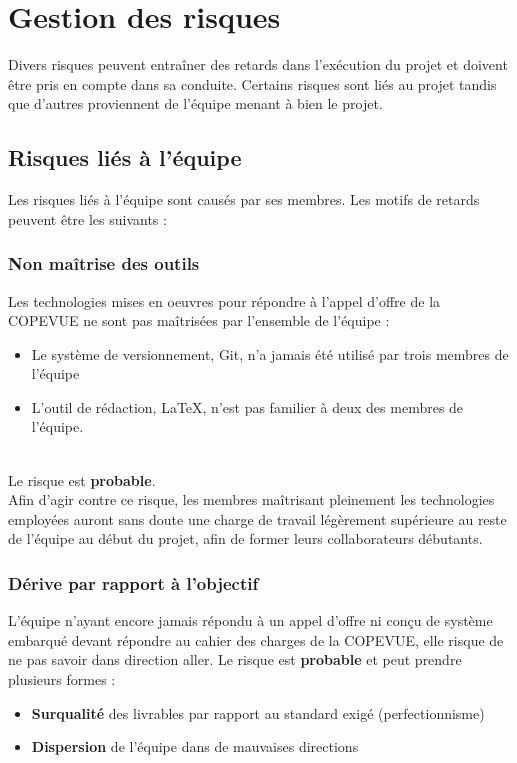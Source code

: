 \section{Gestion des risques}

Divers risques peuvent entraîner des retards dans l'exécution du projet et
doivent être pris en compte dans sa conduite. Certains risques sont liés au
projet tandis que d'autres proviennent de l'équipe menant à bien le projet.

\subsection{Risques liés à l'équipe}

Les risques liés à l'équipe sont causés par ses membres. Les motifs de
retards peuvent être les suivants :

\subsubsection{Non maîtrise des outils}

Les technologies mises en oeuvres pour répondre à l'appel d'offre de la
COPEVUE ne sont pas maîtrisées par l'ensemble de l'équipe :
\begin{itemize}
\item Le système de versionnement, Git, n'a jamais été utilisé par trois
membres de l'équipe
\item L'outil de rédaction, \LaTeX, n'est pas familier à deux des membres
de l'équipe.
\end{itemize}
\hfill\\
Le risque est \textbf{probable}.\\

Afin d'agir contre ce risque, les membres maîtrisant pleinement les
technologies employées auront sans doute une charge de travail légèrement
supérieure au reste de l'équipe au début du projet, afin de former leurs
collaborateurs débutants.


\subsubsection{Dérive par rapport à l'objectif}

L'équipe n'ayant encore jamais répondu à un appel d'offre ni conçu de
système embarqué devant répondre au cahier des charges de la COPEVUE, elle
risque de ne pas savoir dans direction aller. Le risque est
\textbf{probable} et peut prendre plusieurs formes :
\begin{itemize}
\item \textbf{Surqualité} des livrables par rapport au standard exigé
(perfectionnisme)
\item \textbf{Dispersion} de l'équipe dans de mauvaises directions
\end{itemize}
\hfill\\


